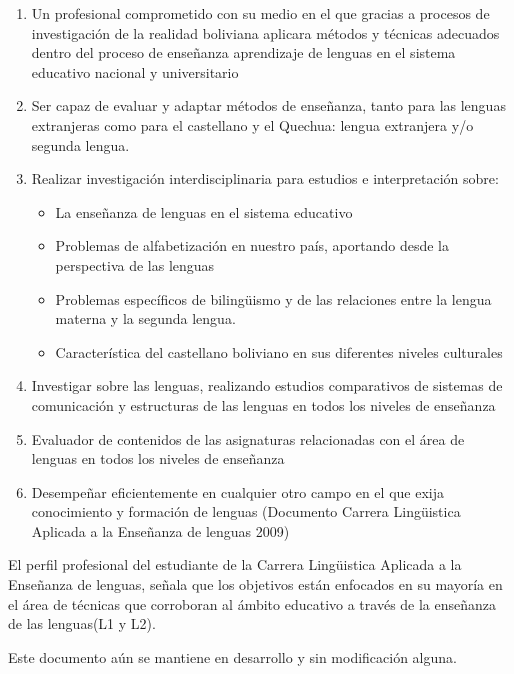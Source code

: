 \begin{enumerate}

\item Un profesional comprometido con su medio en el que gracias a procesos de
investigaci\'{o}n de la realidad boliviana aplicara m\'{e}todos y t\'{e}cnicas
adecuados dentro del proceso de ense\~{n}anza aprendizaje de lenguas en el 
sistema educativo nacional y universitario
\item Ser capaz de evaluar y adaptar m\'{e}todos de ense\~{n}anza, tanto para
las lenguas extranjeras como para el castellano y el Quechua: lengua extranjera
y/o segunda lengua.
\item Realizar investigaci\'{o}n interdisciplinaria para estudios e 
interpretaci\'{o}n sobre:
	\begin{itemize}
	
	\item La ense\~{n}anza de lenguas en el sistema educativo
	\item Problemas de alfabetizaci\'{o}n en nuestro pa\'{i}s, aportando desde la
	perspectiva de las lenguas
	\item Problemas espec\'{i}ficos de biling\"{u}ismo y de las relaciones entre 
	la lengua materna y la segunda lengua.
	\item Caracter\'{i}stica del castellano boliviano en sus diferentes niveles
	culturales
	
	\end{itemize}
\item Investigar sobre las lenguas, realizando estudios comparativos de sistemas
de comunicaci\'{o}n y estructuras de las lenguas en todos los niveles de 
ense\~{n}anza
\item Evaluador de contenidos de las asignaturas relacionadas con el \'{a}rea de
lenguas en todos los niveles de ense\~{n}anza
\item Desempe\~{n}ar eficientemente en cualquier otro campo en el que exija 
conocimiento y formaci\'{o}n de lenguas (Documento Carrera Ling\"{u}istica 
Aplicada a la Ense\~{n}anza de lenguas 2009)

\end{enumerate}

El perfil profesional del estudiante de la Carrera Ling\"{u}istica Aplicada a la
Ense\~{n}anza de lenguas, se\~{n}ala que los objetivos est\'{a}n enfocados en su
mayor\'{i}a en el \'{a}rea de t\'{e}cnicas que corroboran al \'{a}mbito educativo
a trav\'{e}s de la ense\~{n}anza de las lenguas(L1 y L2).

Este documento a\'{u}n se mantiene en desarrollo y sin modificaci\'{o}n alguna.
\cite{Q2014}

